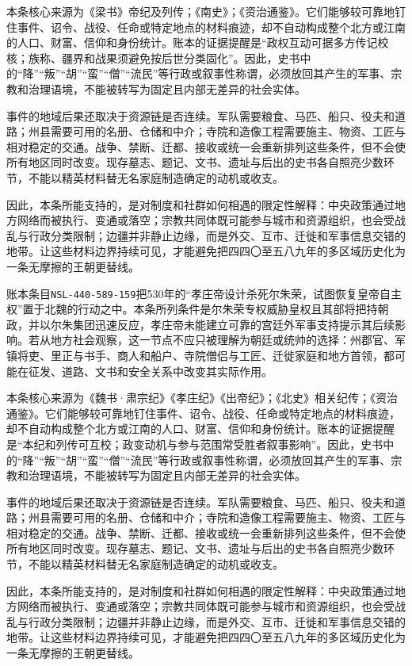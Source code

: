 本条核心来源为《梁书》帝纪及列传；《南史》；《资治通鉴》。它们能够较可靠地钉住事件、诏令、战役、任命或特定地点的材料痕迹，却不自动构成整个北方或江南的人口、财富、信仰和身份统计。账本的证据提醒是“政权互动可据多方传记校核；族称、疆界和战果须避免按后世分类固化”。因此，史书中的“降”“叛”“胡”“蛮”“僧”“流民”等行政或叙事性称谓，必须放回其产生的军事、宗教和治理语境，不能被转写为固定且内部无差异的社会实体。

事件的地域后果还取决于资源链是否连续。军队需要粮食、马匹、船只、役夫和道路；州县需要可用的名册、仓储和中介；寺院和造像工程需要施主、物资、工匠与相对稳定的交通。战争、禁断、迁都、接收或统一会重新排列这些条件，但不会使所有地区同时改变。现存墓志、题记、文书、遗址与后出的史书各自照亮少数环节，不能以精英材料替无名家庭制造确定的动机或收支。

因此，本条所能支持的，是对制度和社群如何相遇的限定性解释：中央政策通过地方网络而被执行、变通或落空；宗教共同体既可能参与城市和资源组织，也会受战乱与行政分类限制；边疆并非静止边缘，而是外交、互市、迁徙和军事信息交错的地带。让这些材料边界持续可见，才能避免把四四〇至五八九年的多区域历史化为一条无摩擦的王朝更替线。

账本条目\texttt{NSL-440-589-159}把530年的“孝庄帝设计杀死尔朱荣，试图恢复皇帝自主权”置于北魏的行动之中。本条所列条件是尔朱荣专权威胁皇权且其部将把持朝政，并以尔朱集团迅速反应，孝庄帝未能建立可靠的宫廷外军事支持提示其后续影响。若从地方社会观察，这一节点不应只被理解为朝廷或统帅的选择：州郡官、军镇将吏、里正与书手、商人和船户、寺院僧侣与工匠、迁徙家庭和地方首领，都可能在征发、道路、文书和安全关系中改变其实际作用。

本条核心来源为《魏书·肃宗纪》《孝庄纪》《出帝纪》；《北史》相关纪传；《资治通鉴》。它们能够较可靠地钉住事件、诏令、战役、任命或特定地点的材料痕迹，却不自动构成整个北方或江南的人口、财富、信仰和身份统计。账本的证据提醒是“本纪和列传可互校；政变动机与参与范围常受胜者叙事影响”。因此，史书中的“降”“叛”“胡”“蛮”“僧”“流民”等行政或叙事性称谓，必须放回其产生的军事、宗教和治理语境，不能被转写为固定且内部无差异的社会实体。

事件的地域后果还取决于资源链是否连续。军队需要粮食、马匹、船只、役夫和道路；州县需要可用的名册、仓储和中介；寺院和造像工程需要施主、物资、工匠与相对稳定的交通。战争、禁断、迁都、接收或统一会重新排列这些条件，但不会使所有地区同时改变。现存墓志、题记、文书、遗址与后出的史书各自照亮少数环节，不能以精英材料替无名家庭制造确定的动机或收支。

因此，本条所能支持的，是对制度和社群如何相遇的限定性解释：中央政策通过地方网络而被执行、变通或落空；宗教共同体既可能参与城市和资源组织，也会受战乱与行政分类限制；边疆并非静止边缘，而是外交、互市、迁徙和军事信息交错的地带。让这些材料边界持续可见，才能避免把四四〇至五八九年的多区域历史化为一条无摩擦的王朝更替线。

